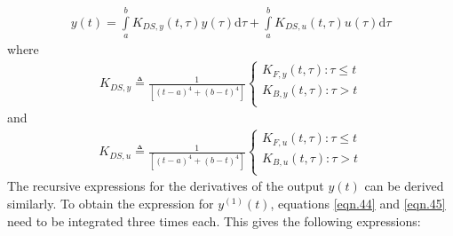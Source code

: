 \documentclass{article}
\begin{document}
\begin{equation}\label{eqn.75}
\begin{split}
	y(t) = \int\limits_{a}^{b}K_{DS,y}(t,\tau)y(\tau)\mathrm{d}\tau + \int\limits_{a}^{b}K_{DS,u}(t,\tau)u(\tau)\mathrm{d}\tau
\end{split}
\end{equation}
where
\begin{equation}\label{eqn.76}
\begin{split}
	K_{DS,y}\triangleq\frac{1}{[(t-a)^4 + (b-t)^4]}\begin{cases}
	K_{F,y}(t,\tau) : \tau\leq t\\
	K_{B,y}(t,\tau) : \tau> t\\
	\end{cases}
\end{split}
\end{equation}
and
\begin{equation}\label{eqn.77}
\begin{split}
	K_{DS,u}\triangleq\frac{1}{[(t-a)^4 + (b-t)^4]}\begin{cases}
	K_{F,u}(t,\tau) : \tau\leq t\\
	K_{B,u}(t,\tau) : \tau> t\\
\end{cases}
\end{split}
\end{equation}
The recursive expressions for the derivatives of the output $y(t)$ can be derived similarly. To obtain the expression for $y^{(1)}(t)$, equations \eqref{eqn.44} and \eqref{eqn.45} need to be integrated three times each. This gives the following expressions:
\end{document}

